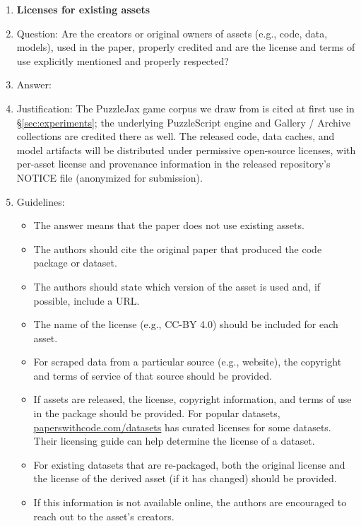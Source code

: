 \begin{enumerate}
\item {\bf Licenses for existing assets}
    \item[] Question: Are the creators or original owners of assets (e.g., code, data, models), used in the paper, properly credited and are the license and terms of use explicitly mentioned and properly respected?
    \item[] Answer: \answerYes{}
    \item[] Justification: The PuzzleJax game corpus we draw from \cite{earle2025puzzlejax} is cited at first use in \S\ref{sec:experiments}; the underlying PuzzleScript engine and Gallery / Archive collections are credited there as well. The released code, data caches, and model artifacts will be distributed under permissive open-source licenses, with per-asset license and provenance information in the released repository's NOTICE file (anonymized for submission).
    \item[] Guidelines:
    \begin{itemize}
        \item The answer \answerNA{} means that the paper does not use existing assets.
        \item The authors should cite the original paper that produced the code package or dataset.
        \item The authors should state which version of the asset is used and, if possible, include a URL.
        \item The name of the license (e.g., CC-BY 4.0) should be included for each asset.
        \item For scraped data from a particular source (e.g., website), the copyright and terms of service of that source should be provided.
        \item If assets are released, the license, copyright information, and terms of use in the package should be provided. For popular datasets, \url{paperswithcode.com/datasets} has curated licenses for some datasets. Their licensing guide can help determine the license of a dataset.
        \item For existing datasets that are re-packaged, both the original license and the license of the derived asset (if it has changed) should be provided.
        \item If this information is not available online, the authors are encouraged to reach out to the asset's creators.
    \end{itemize}


\end{enumerate}

